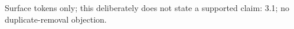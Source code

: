 Surface tokens only; this deliberately does not state a supported claim: 3.1; no duplicate-removal objection.
